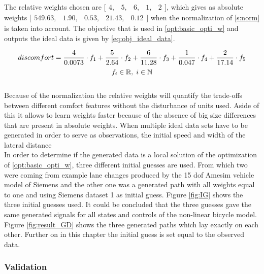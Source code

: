 The relative weights chosen are $ \bigl[ \begin{smallmatrix} 4,&5,&6,&1,&2\end{smallmatrix}\bigr]$, which gives as absolute weights  $ \bigl[ \begin{smallmatrix} 549.63, &1.90, &0.53,  &21.43, &0.12\end{smallmatrix}\bigr]$ when the normalization of \ref{s:norm} is taken into account. The objective that is used in \ref{opt:basic_opti_w} and outputs the ideal data is given by \ref{eq:obj_ideal_data}.

\begin{equation}\label{eq:obj_ideal_data}
discomfort = \frac{4}{0.0073} \cdot f_1 +\frac{5}{2.64} \cdot f_2 +\frac{6}{11.28} \cdot f_3 +\frac{1}{0.047} \cdot f_4 +\frac{2}{17.14} \cdot f_5 \\
\end{equation}
\[	f_i \in \mathbb{R}, \hspace{1mm}
i \in \mathbb{N}\]\\

Because of the normalization the relative weights will quantify the trade-offs between different comfort features without the disturbance of units used. Aside of this it allows to learn weights faster because of the absence of big size differences that are present in absolute weights. When multiple ideal data sets have to be generated in order to serve as observations, the initial speed and width of the lateral distance \\
In order to determine if the generated data is a local solution of the optimization of \ref{opt:basic_opti_w}, three different initial guesses are used. From which two were coming from example lane changes produced by the 15 dof Amesim vehicle model of Siemens and the other one was a generated path with all weights equal to one and using Siemens dataset 1 as initial guess. Figure \ref{fig:IG} shows the three initial guesses used. It could be concluded that the three guesses gave the same generated signals for all states and controls of the non-linear bicycle model. Figure \ref{fig:result_GD} shows the three generated paths which lay exactly on each other. Further on in this chapter the initial guess is set equal to the observed data.

\subsubsection{Validation} \label{s:GD_val}

